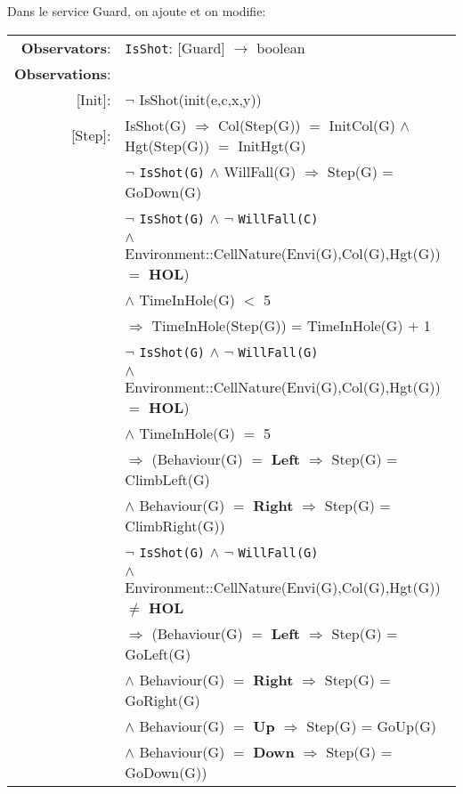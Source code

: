 \documentclass[8pt]{article}
\begin{document}
Dans le service \textrm{Guard}, on ajoute et on modifie:
{\small
  \begin{longtable}{rl}
    \textbf{Observators}:& \texttt{IsShot}: \textrm{[Guard]} $\rightarrow$ \textrm{boolean} \\
    \textbf{Observations}:&\\
    \textrm{[Init]}: & $\neg$ \textrm{IsShot(init(e,c,x,y))} \\

    \textrm{[Step]}: & \textrm{IsShot(G)} $\Rightarrow$ \textrm{Col(Step(G))} $=$ \textrm{InitCol(G)} $\land$ \textrm{Hgt(Step(G))} $=$ \textrm{InitHgt(G)} \\

    & $\neg$ \texttt{IsShot(G)} $\land$ \textrm{WillFall(G)} $\Rightarrow$ \textrm{Step(G)} = \textrm{GoDown(G)} \\

    & $\neg$ \texttt{IsShot(G)} $\land$ $\neg$ \texttt{WillFall(C)} \\
    & \quad\quad $\land$ \textrm{Environment::CellNature(Envi(G),Col(G),Hgt(G))} $=$ \textbf{HOL}) \\
    & \quad\quad $\land$ \textrm{TimeInHole(G)} $<$ 5 \\
    & \quad\quad $\Rightarrow$ \textrm{TimeInHole(Step(G))} = \textrm{TimeInHole(G)} $+$ 1 \\

    & $\neg$ \texttt{IsShot(G)} $\land$ $\neg$ \texttt{WillFall(G)} \\
    & \quad\quad $\land$ \textrm{Environment::CellNature(Envi(G),Col(G),Hgt(G))} $=$ \textbf{HOL}) \\
    & \quad\quad $\land$ \textrm{TimeInHole(G)} $=$ 5 \\
    & \quad\quad $\Rightarrow$ (\textrm{Behaviour(G)} $=$ \textbf{Left} $\Rightarrow$ \textrm{Step(G)} = \textrm{ClimbLeft(G)} \\
    & \quad\quad\quad\quad $\land$ \textrm{Behaviour(G)} $=$ \textbf{Right} $\Rightarrow$ \textrm{Step(G)} = \textrm{ClimbRight(G)}) \\

    & $\neg$ \texttt{IsShot(G)} $\land$ $\neg$ \texttt{WillFall(G)} \\
    & \quad\quad $\land$ \textrm{Environment::CellNature(Envi(G),Col(G),Hgt(G))} $\neq$ \textbf{HOL} \\
    & \quad\quad $\Rightarrow$ (\textrm{Behaviour(G)} $=$ \textbf{Left} $\Rightarrow$ \textrm{Step(G)} = \textrm{GoLeft(G)} \\
    & \quad\quad\quad\quad $\land$ \textrm{Behaviour(G)} $=$ \textbf{Right} $\Rightarrow$ \textrm{Step(G)} = \textrm{GoRight(G)}\\
    & \quad\quad\quad\quad $\land$ \textrm{Behaviour(G)} $=$ \textbf{Up} $\Rightarrow$ \textrm{Step(G)} = \textrm{GoUp(G)}\\
    & \quad\quad\quad\quad $\land$ \textrm{Behaviour(G)} $=$ \textbf{Down} $\Rightarrow$ \textrm{Step(G)} = \textrm{GoDown(G)})\\
  \end{longtable}}
\end{document}
